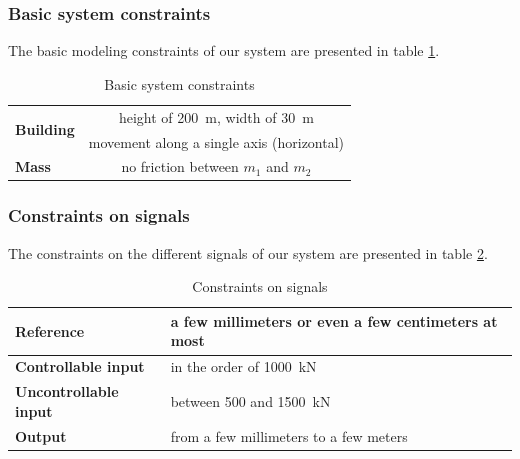 \subsubsection{Basic system constraints}
The basic modeling constraints of our system are presented in table \ref{tab:constraints_assumptions_limitations}.\par
\begin{table}[H]
    \centering
    \begin{tabular}{|l|c|}
        \hline
        \multirow{2}{*}{{\bf Building}} & height of \SI{200}{\meter}, width of \SI{30}{\meter}\\ & movement along a single axis (horizontal)\\\hline
        {\bf Mass} & no friction between $m_1$ and $m_2$\\ \hline
    \end{tabular}
    \caption{Basic system constraints}
    \label{tab:constraints_assumptions_limitations}
\end{table}

\subsubsection{Constraints on signals}
The constraints on the different signals of our system are presented in table \ref{tab:constraints_signals}.
\begin{table}[H]
    \centering
    \begin{tabular}{|l|m{5cm}|}
        \hline
        {\bf Reference} & a few millimeters or even a few centimeters at most\\ \hline
        {\bf Controllable input} & in the order of \SI{1000}{\kilo\newton}\\ \hline
        {\bf Uncontrollable input} & between \num{500} and \SI{1500}{\kilo\newton}\\ \hline
        {\bf Output} & from a few millimeters to a few meters\\ \hline
    \end{tabular}
    \caption{Constraints on signals}
    \label{tab:constraints_signals}
\end{table}


